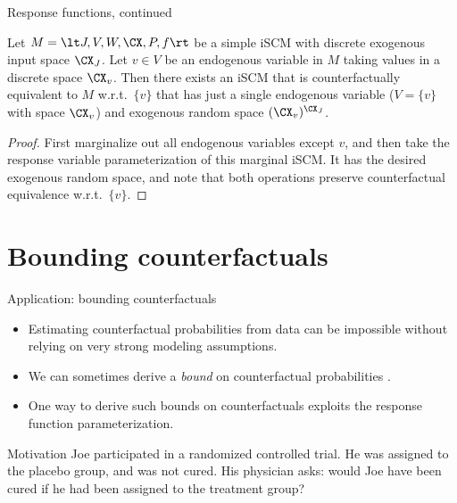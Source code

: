\begin{frame}{Response functions, continued}
\begin{Cor}[\ref{cor:counterfactual_equivalence_response_functions}]
  Let $M = \lt J, V, W, \CX, P, f \rt$ be a simple iSCM with discrete exogenous input space $\CX_J$.
  Let $v \in V$ be an endogenous variable in $M$ taking values in a discrete space $\CX_v$.
  Then there exists an iSCM that is counterfactually equivalent to $M$ w.r.t.\ $\{v\}$ that has
  just a single endogenous variable ($V=\{v\}$ with space $\CX_v$) and exogenous random space $(\CX_v)^{\CX_J}$.
\end{Cor}
\begin{proof}
  First marginalize out all endogenous variables except $v$, and then take the response variable parameterization of this marginal iSCM.
  It has the desired exogenous random space, and note that both operations preserve counterfactual equivalence w.r.t.\ $\{v\}$.
\end{proof}
\end{frame}

\part{Bounding counterfactuals}
\frame{\partpage}

\begin{frame}{Application: bounding counterfactuals}
  \begin{itemize}
    \item Estimating counterfactual probabilities from data can be impossible without relying on very strong modeling assumptions.
    \item We can sometimes derive a \emph{bound} on counterfactual probabilities \cite{BalkePearl1994b}.
    \item One way to derive such bounds on counterfactuals exploits the response function parameterization.
  \end{itemize}

  \bigskip
  \begin{block}{Motivation}
    Joe participated in a randomized controlled trial. He was assigned to the placebo group, and was not cured.
    His physician asks: would Joe have been cured if he had been assigned to the treatment group?
  \end{block}
\end{frame}

